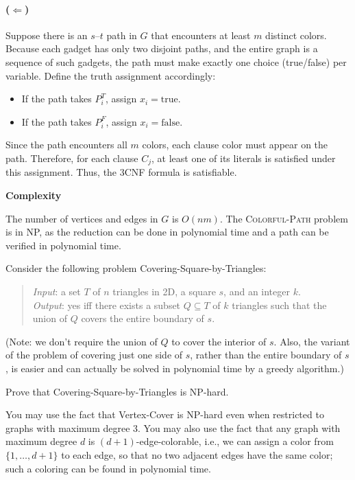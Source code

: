 \documentclass[11pt]{article}
\begin{document}
\begin{description}
\paragraph{($\Leftarrow$)} Suppose there is an $s$–$t$ path in $G$ that encounters at least $m$ distinct colors. Because each gadget has only two disjoint paths, and the entire graph is a sequence of such gadgets, the path must make exactly one choice (true/false) per variable. Define the truth assignment accordingly:
\begin{itemize}
  \item If the path takes $P_i^T$, assign $x_i = \text{true}$.
  \item If the path takes $P_i^F$, assign $x_i = \text{false}$.
\end{itemize}
Since the path encounters all $m$ colors, each clause color must appear on the path. Therefore, for each clause $C_j$, at least one of its literals is satisfied under this assignment. Thus, the 3CNF formula is satisfiable.

\textbf{Complexity}

The number of vertices and edges in $G$ is $O(nm)$. The \textsc{Colorful-Path} problem is in NP, as the reduction can be done in polynomial time and a path can be verified in polynomial time.


\newpage
\item[Problem 9.2:]
Consider the following problem {\sc Covering-Square-by-Triangles}:
\begin{quote}
\emph{Input}: a set $T$ of $n$ triangles in 2D, a square $s$, and an integer $k$.\\[2pt]
\emph{Output}: yes iff there exists a subset $Q\subseteq T$ of $k$ triangles such that the union of $Q$ covers the entire boundary of $s$.
\end{quote}

(Note: we don't require the union of $Q$ to cover the interior of $s$.  Also, the variant of the problem of covering just one side of $s$, rather than the entire boundary of $s$, is easier and can  actually be solved in polynomial time by a greedy algorithm.)

Prove that {\sc Covering-Square-by-Triangles} is NP-hard.

You may use the fact that {\sc Vertex-Cover} is NP-hard even when restricted to graphs with maximum degree 3.  You may also use the fact that any graph with maximum degree $d$ is $(d+1)$-edge-colorable, i.e., we can assign a color from $\{1,\ldots,d+1\}$ to each edge, so that no two adjacent edges have the same color; such a coloring can be found in polynomial time.


\end{description}
\end{document}
